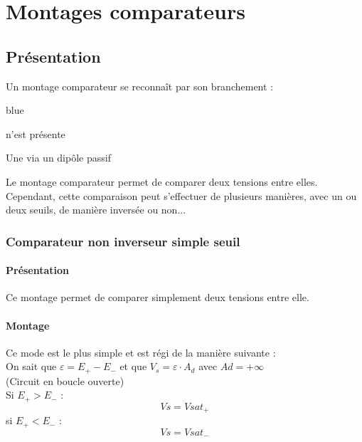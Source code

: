 

\chapter{Montages comparateurs}
\section{Présentation}

Un montage comparateur se reconnaît par son branchement : 

\begin{items}{blue}{\Triangle}
  \item {} n’est présente
  \item Une  via un dipôle passif
\end{items}

Le montage comparateur permet de comparer deux tensions entre elles. \\
Cependant, cette comparaison peut s’effectuer de plusieurs manières, avec un ou deux seuils, de manière inversée ou non...

\subsection{Comparateur non inverseur simple seuil}

\subsubsection{Présentation}

Ce montage permet de comparer simplement deux tensions entre elle.

\subsubsection{Montage}


Ce mode est le plus simple et est régi de la manière suivante : \\

On sait que $\varepsilon = E_+ - E_-$ et que $V_s=\varepsilon \cdot A_d$ avec $Ad=+\infty$ \\
(Circuit en boucle ouverte) \\


Si $E_+>E_-$ :
$$Vs=Vsat_+$$ 
 si $E_+<E_-$ :
$$Vs=Vsat_-$$

